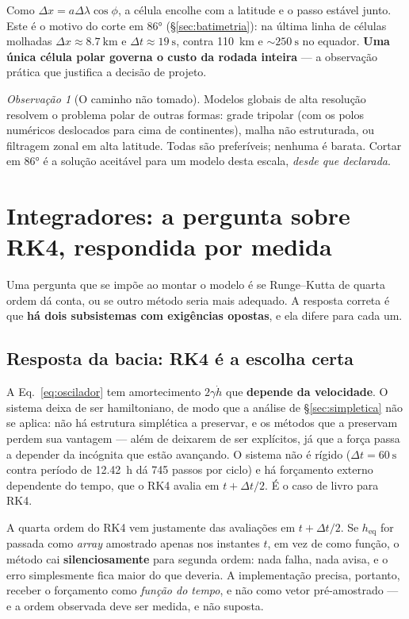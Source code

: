 \documentclass[11pt,a4paper,oneside]{report}
\theoremstyle{definition}
\theoremstyle{plain}
\theoremstyle{remark}
\newtheorem{observacao}[definicao]{Observação}
\begin{document}
Como $\Delta x=a\Delta\lambda\cos\phi$, a célula encolhe com a latitude e o
passo estável junto. Este é o motivo do corte em \ang{86}
(\S\ref{sec:batimetria}): na última linha de células molhadas
$\Delta x\approx\SI{8.7}{\kilo\meter}$ e
$\Delta t\approx\SI{19}{\second}$, contra \SI{110}{\kilo\meter} e
$\sim\SI{250}{\second}$ no equador. \textbf{Uma única célula polar governa o
custo da rodada inteira} — a observação prática que justifica a decisão de
projeto.

\begin{observacao}[O caminho não tomado]
Modelos globais de alta resolução resolvem o problema polar de outras formas:
grade tripolar (com os polos numéricos deslocados para cima de continentes),
malha não estruturada, ou filtragem zonal em alta latitude. Todas são
preferíveis; nenhuma é barata. Cortar em \ang{86} é a solução aceitável para um
modelo desta escala, \emph{desde que declarada}.
\end{observacao}

\section{Integradores: a pergunta sobre RK4, respondida por medida}
\label{sec:integradores}

Uma pergunta que se impõe ao montar o modelo é se Runge--Kutta de quarta
ordem dá conta, ou se outro método seria mais adequado. A resposta correta é
que \textbf{há dois subsistemas com exigências opostas}, e ela difere para
cada um.

\subsection{Resposta da bacia: RK4 é a escolha certa}

A Eq.~\eqref{eq:oscilador} tem amortecimento $2\gamma\dot h$ que
\textbf{depende da velocidade}. O sistema deixa de ser hamiltoniano, de modo que
a análise de \S\ref{sec:simpletica} não se aplica: não há estrutura simplética a
preservar, e os métodos que a preservam perdem sua vantagem — além de deixarem
de ser explícitos, já que a força passa a depender da incógnita que estão
avançando. O sistema não é rígido
($\Delta t=\SI{60}{\second}$ contra período de \SI{12.42}{\hour} dá
\num{745} passos por ciclo) e há forçamento externo dependente do tempo, que o
RK4 avalia em $t+\Delta t/2$. É o caso de livro para RK4.

\begin{alerta}
A quarta ordem do RK4 vem justamente das avaliações em $t+\Delta t/2$. Se
$h_{\text{eq}}$ for passada como \emph{array} amostrado apenas nos instantes
$t$, em vez de como função, o método cai \textbf{silenciosamente} para segunda
ordem: nada falha, nada avisa, e o erro simplesmente fica maior do que deveria.
A implementação precisa, portanto, receber o forçamento como \emph{função do
tempo}, e não como vetor pré-amostrado — e a ordem observada deve ser medida, e
não suposta.
\end{alerta}
\end{document}
